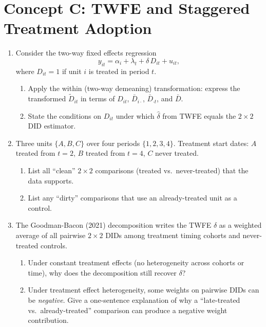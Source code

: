 \documentclass{article}
\begin{document}
\bigskip

\section*{Concept C: TWFE and Staggered Treatment Adoption}

\begin{enumerate}[label=\textbf{C.\arabic*},leftmargin=*,itemsep=10pt]

\item  Consider the two-way fixed effects regression
$$y_{it} = \alpha_i + \lambda_t + \delta\,D_{it} + u_{it},$$
where $D_{it} = 1$ if unit $i$ is treated in period $t$.
\begin{enumerate}[label=(\alph*)]
  \item Apply the within (two-way demeaning) transformation: express the transformed $\tilde D_{it}$ in terms of $D_{it}$, $\bar D_{i\cdot}$, $\bar D_{\cdot t}$, and $\bar D$.
  \item State the conditions on $D_{it}$ under which $\hat\delta$ from TWFE equals the $2\times 2$ DID estimator.
\end{enumerate}

\item  Three units $\{A, B, C\}$ over four periods $\{1, 2, 3, 4\}$.  Treatment start dates: $A$ treated from $t = 2$, $B$ treated from $t = 4$, $C$ never treated.
\begin{enumerate}[label=(\alph*)]
  \item List all ``clean'' $2\times 2$ comparisons (treated vs.\ never-treated) that the data supports.
  \item List any ``dirty'' comparisons that use an already-treated unit as a control.
\end{enumerate}

\item  The Goodman-Bacon (2021) decomposition writes the TWFE $\hat\delta$ as a weighted average of all pairwise $2\times 2$ DIDs among treatment timing cohorts and never-treated controls.
\begin{enumerate}[label=(\alph*)]
  \item Under constant treatment effects (no heterogeneity across cohorts or time), why does the decomposition still recover $\delta$?
  \item Under treatment effect heterogeneity, some weights on pairwise DIDs can be \emph{negative}.  Give a one-sentence explanation of why a ``late-treated vs.\ already-treated'' comparison can produce a negative weight contribution.
\end{enumerate}


\end{enumerate}
\end{document}
